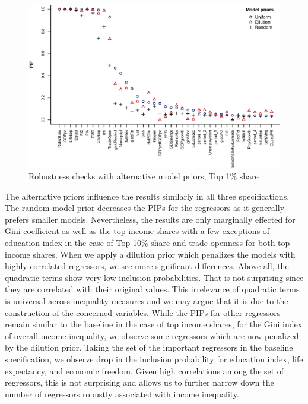 \begin{refsection}
\begin{figure}[ht!]
  \caption{Robustness checks with alternative model priors, Top 1\% share}
  \label{ch4fig:top1_comp}
  \centering
  \includegraphics[width=\textwidth, keepaspectratio]{figures/ch4/model_priors_comparison_top1}
\end{figure}

The alternative priors influence the results similarly in all three specifications. The random model prior decreases the \acp{PIP} for the regressors as it generally prefers smaller models. Nevertheless, the results are only marginally effected for Gini coefficient as well as the top income shares with a few exceptions of education index in the case of Top 10\% share and trade openness for both top income shares. When we apply a dilution prior which penalizes the models with highly correlated regressors, we see more significant differences. Above all, the quadratic terms show very low inclusion probabilities. That is not surprising since they are correlated with their original values. This irrelevance of quadratic terms is universal across inequality measures and we may argue that it is due to the construction of the concerned variables. While the \acp{PIP} for other regressors remain similar to the baseline in the case of top income shares, for the Gini index of overall income inequality, we observe some regressors which are now penalized by the dilution prior. Taking the set of the important regressors in the baseline specification, we observe drop in the inclusion probability for education index, life expectancy, and economic freedom. Given high correlations among the set of regressors, this is not surprising and allows us to further narrow down the number of regressors robustly associated with income inequality.


\end{refsection}
